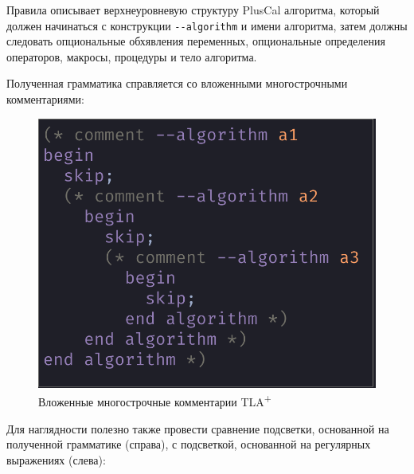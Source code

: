 \documentclass[14pt, openany]{report}
\newcommand{\tlapl}{TLA\textsuperscript{+} }
\begin{document}
Правила описывает верхнеуровневую структуру PlusCal алгоритма, который должен начинаться с конструкции \lstinline[style=progStyle]{--algorithm} и имени алгоритма, затем должны следовать опциональные обхявления переменных, опциональные определения операторов, макросы, процедуры и тело алгоритма.

Полученная грамматика справляется со вложенными многострочными комментариями:

\begin{figure}[h]
  \centering
  \includegraphics[scale=0.44]{nestedPcal}
  \caption{Вложенные многострочные комментарии \tlapl}
  \label{fig:nestedPcal}
\end{figure}

Для наглядности полезно также провести сравнение подсветки, основанной на полученной грамматике (справа), с подсветкой, основанной на регулярных выражениях (слева):
\end{document}
